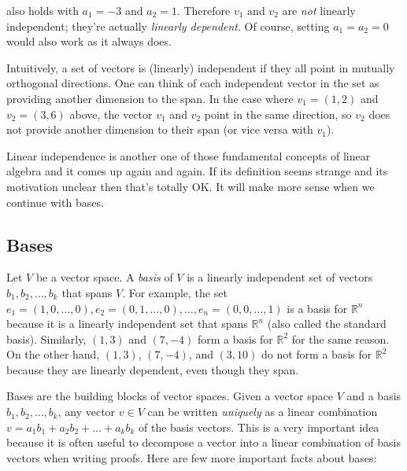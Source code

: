 \documentclass[12pt]{article}
\begin{document}
also holds with $a_1 = -3$ and $a_2 = 1$. Therefore $v_1$ and $v_2$ are \textit{not} linearly independent; they're actually \textit{linearly dependent}. Of course, setting $a_1 = a_2 = 0$ would also work as it always does.

Intuitively, a set of vectors is (linearly) independent if they all point in mutually orthogonal directions. One can think of each independent vector in the set as providing another dimension to the span. In the case where $v_1 = (1, 2)$ and $v_2 = (3, 6)$ above, the vector $v_1$ and $v_2$ point in the same direction, so $v_2$ does not provide another dimension to their span (or vice versa with $v_1$). 

Linear independence is another one of those fundamental concepts of linear algebra and it comes up again and again. If its definition seems strange and its motivation unclear then that's totally OK. It will make more sense when we continue with bases.

\subsection*{Bases}

Let $V$ be a vector space. A \textit{basis} of $V$ is a linearly independent set of vectors $b_1, b_2, \ldots, b_k$ that spans $V$. For example, the set $e_1 = (1, 0, \ldots, 0), e_2 = (0, 1, \ldots, 0), \ldots, e_n = (0, 0, \ldots, 1)$ is a basis for $\mathbb{R}^n$ because it is a linearly independent set that spans $\mathbb{R}^n$ (also called the standard basis).  Similarly, $(1, 3)$ and $(7, -4)$ form a basis for $\mathbb{R}^2$ for the same reason. On the other hand, $(1, 3)$, $(7, -4)$, and $(3, 10)$ do not form a basis for $\mathbb{R}^2$ because they are linearly dependent, even though they span.

Bases are the building blocks of vector spaces. Given a vector space $V$ and a basis $b_1, b_2, \ldots, b_k$, any vector $v \in V$ can be written \textit{uniquely} as a linear combination $v = a_1 b_1 + a_2 b_2 + \ldots + a_k b_k$ of the basis vectors. This is a very important idea because it is often useful to decompose a vector into a linear combination of basis vectors when writing proofs. Here are few more important facts about bases:
\end{document}
